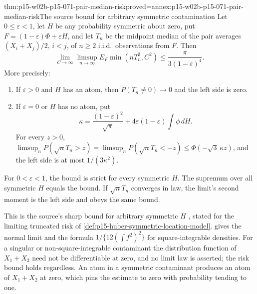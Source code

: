 \begin{hbtheorem}{thm:p15-w02b-p15-071-pair-median-risk}{proved=annex:p15-w02b-p15-071-pair-median-risk}{The source bound for arbitrary symmetric contamination}
Let \(0\leq\varepsilon<1\), let \(H\) be any probability symmetric about
zero, put \(F=(1-\varepsilon)\Phi+\varepsilon H\), and let \(T_n\) be the
midpoint median of the pair averages \((X_i+X_j)/2\), \(i<j\), of
\(n\geq2\) i.i.d.\ observations from \(F\). Then
\[
 \lim_{C\to\infty}\limsup_{n\to\infty}E_F\min(nT_n^2,C^2)
 \leq\frac{\pi}{3(1-\varepsilon)^4}.
\]
More precisely:
\begin{enumerate}
\item If \(\varepsilon>0\) and \(H\) has an atom, then
 \(P(T_n\neq0)\to0\) and the left side is zero.
\item If \(\varepsilon=0\) or \(H\) has no atom, put
 \[
  \kappa=\frac{(1-\varepsilon)^2}{\sqrt\pi}
          +4\varepsilon(1-\varepsilon)\int\phi\,dH .
 \]
 For every \(z>0\),
 \(\limsup_nP(\sqrt nT_n>z)=\limsup_nP(\sqrt nT_n<-z)\leq
 \Phi(-\sqrt3\,\kappa z)\), and the left side is at most
 \(1/(3\kappa^2)\).
\end{enumerate}
For \(0<\varepsilon<1\), the bound is strict for every symmetric \(H\).
The supremum over all symmetric \(H\) equals the bound.
If \(\sqrt nT_n\) converges in law, the limit's second moment is the
left side and obeys the same bound.
\end{hbtheorem}

This is the source's sharp bound for arbitrary symmetric \(H\)
\cite[pp.~100--101]{Huber1964RobustLocation}, stated for the limiting
truncated risk of \cref{def:p15-huber-symmetric-location-model}.
 gives the normal limit and the formula
\(1/\{12(\int f^2)^2\}\) for square-integrable densities. For a singular
or non-square-integrable contaminant the distribution function of
\(X_1+X_2\) need not be differentiable at zero, and no limit law is
asserted; the risk bound holds regardless. An atom in a symmetric
contaminant produces an atom of \(X_1+X_2\) at zero, which pins the
estimate to zero with probability tending to one.
